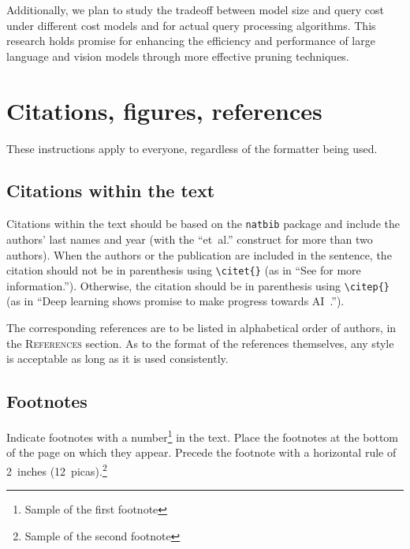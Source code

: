\documentclass{article} %
\begin{document}
Additionally, we plan to study the tradeoff between model size and query cost under different cost models and for actual query processing algorithms. This research holds promise for enhancing the efficiency and performance of large language and vision models through more effective pruning techniques.

\section{Citations, figures, references}
\label{others}

These instructions apply to everyone, regardless of the formatter being used.

\subsection{Citations within the text}

Citations within the text should be based on the \texttt{natbib} package
and include the authors' last names and year (with the ``et~al.'' construct
for more than two authors). When the authors or the publication are
included in the sentence, the citation should not be in parenthesis using \verb|\citet{}| (as
in ``See \citet{Hinton06} for more information.''). Otherwise, the citation
should be in parenthesis using \verb|\citep{}| (as in ``Deep learning shows promise to make progress
towards AI~\citep{Bengio+chapter2007}.'').

The corresponding references are to be listed in alphabetical order of
authors, in the \textsc{References} section. As to the format of the
references themselves, any style is acceptable as long as it is used
consistently.

\subsection{Footnotes}

Indicate footnotes with a number\footnote{Sample of the first footnote} in the
text. Place the footnotes at the bottom of the page on which they appear.
Precede the footnote with a horizontal rule of 2~inches
(12~picas).\footnote{Sample of the second footnote}
\end{document}
